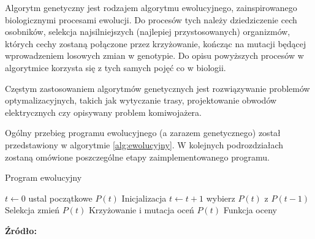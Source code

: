 Algorytm genetyczny jest rodzajem algorytmu ewolucyjnego, zainspirowanego biologicznymi procesami ewolucji\cite{genetyczne}. Do procesów tych należy dziedziczenie cech osobników, selekcja najsilniejszych (najlepiej przystosowanych) organizmów, których cechy zostaną połączone przez krzyżowanie, kończąc na mutacji będącej wprowadzeniem losowych zmian w genotypie. Do opisu powyższych procesów w algorytmice korzysta się z tych samych pojęć co w biologii.

Częstym zastosowaniem algorytmów genetycznych jest rozwiązywanie problemów optymalizacyjnych, takich jak wytyczanie trasy, projektowanie obwodów elektrycznych czy opisywany problem komiwojażera.

Ogólny przebieg programu ewolucyjnego (a zarazem genetycznego) został przedstawiony w algorytmie \ref{alg:ewolucyjny}. W kolejnych podrozdziałach zostaną omówione poszczególne etapy zaimplementowanego programu.

\begin{algorithm}
	\caption{Program ewolucyjny}\label{alg:ewolucyjny}
	\begin{algorithmic}[1]
		\State $t\gets 0$
		\State ustal początkowe $P(t)$ 	\Comment Inicjalizacja
			\State $t\gets t + 1$
			\State wybierz $P(t)$ z $P(t - 1)$ \Comment Selekcja
			\State zmień $P(t)$ \Comment Krzyżowanie i mutacja
			\State oceń $P(t)$ \Comment Funkcja oceny
		\EndWhile
		\EndProcedure
	\end{algorithmic}
\end{algorithm}
\begin{center}
	\textbf{Źródło:} \cite{genetyczne}
\end{center}